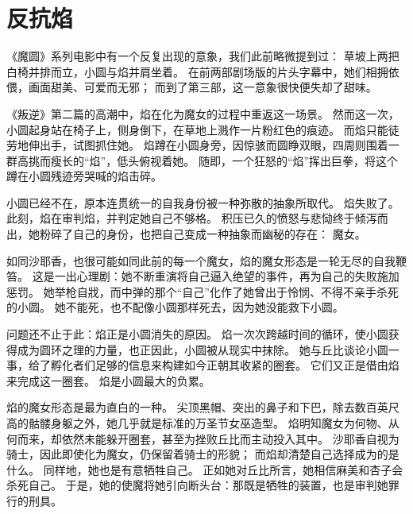 \chapter{反抗焰}
《魔圆》系列电影中有一个反复出现的意象，我们此前略微提到过：
草坡上两把白椅并排而立，小圆与焰并肩坐着。
在前两部剧场版的片头字幕中，她们相拥依偎，画面甜美、可爱而无邪；
而到了第三部，这一意象很快便失却了甜味。

《叛逆》第二篇的高潮中，焰在化为魔女的过程中重返这一场景。
然而这一次，小圆起身站在椅子上，侧身倒下，在草地上溅作一片粉红色的痕迹。
而焰只能徒劳地伸出手，试图抓住她。
焰蹲在小圆身旁，因惊骇而圆睁双眼，四周则围着一群高挑而瘦长的“焰”，低头俯视着她。
随即，一个狂怒的“焰”挥出巨拳，将这个蹲在小圆残迹旁哭喊的焰击碎。%

小圆已经不在，原本连贯统一的自我身份被一种弥散的抽象所取代。
焰失败了。
此刻，焰在审判焰，并判定她自己不够格。
积压已久的愤怒与悲恸终于倾泻而出，她粉碎了自己的身份，也把自己变成一种抽象而幽秘的存在：
魔女。

如同沙耶香，也很可能如同此前的每一个魔女，焰的魔女形态是一轮无尽的自我鞭笞。
这是一出心理剧：她不断重演将自己逼入绝望的事件，再为自己的失败施加惩罚。
她举枪自戕，而中弹的那个“自己”化作了她曾出于怜悯、不得不亲手杀死的小圆。
她不能死，也不配像小圆那样死去，因为她没能救下小圆。

问题还不止于此：焰正是小圆消失的原因。
焰一次次跨越时间的循环，使小圆获得成为圆环之理的力量，也正因此，小圆被从现实中抹除。
她与丘比谈论小圆一事，给了孵化者们足够的信息来构建如今正朝其收紧的圈套。
它们又正是借由焰来完成这一圈套。
焰是小圆最大的负累。

焰的魔女形态是最为直白的一种。
尖顶黑帽、突出的鼻子和下巴，除去数百英尺高的骷髅身躯之外，她几乎就是标准的万圣节女巫造型。
焰明知魔女为何物、从何而来，却依然未能躲开圈套，甚至为挫败丘比而主动投入其中。
沙耶香自视为骑士，因此即使化为魔女，仍保留着骑士的形貌；
而焰却清楚自己选择成为的是什么。
同样地，她也是有意牺牲自己。
正如她对丘比所言，她相信麻美和杏子会杀死自己。
于是，她的使魔将她引向断头台：那既是牺牲的装置，也是审判她罪行的刑具。

